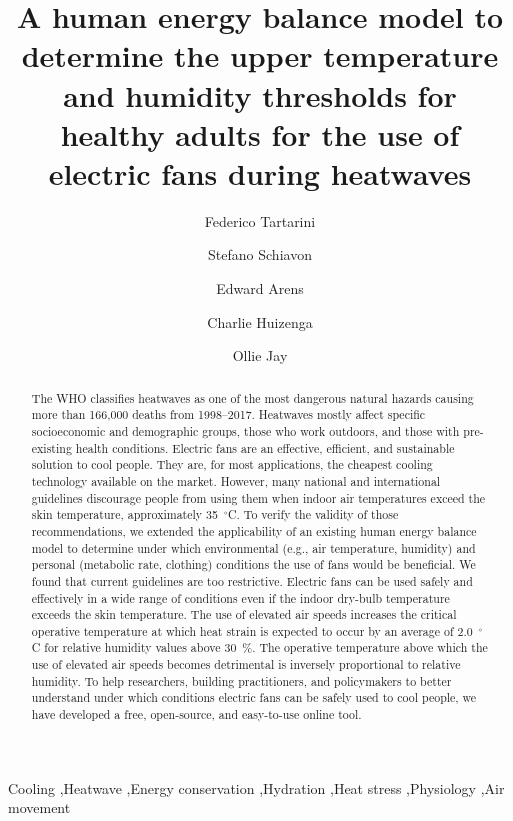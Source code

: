 
\begin{frontmatter}

\title{A human energy balance model to determine the upper temperature and humidity thresholds for healthy adults for the use of electric fans during heatwaves}

\author[sinBerBest]{Federico Tartarini}
\author[CBE]{Stefano Schiavon}
\author[CBE]{Edward Arens}
\author[CBE]{Charlie Huizenga}
 \author[USYD]{Ollie Jay}

\address[sinBerBest]{SinBerBEST, Berkeley Education Alliance for Research in Singapore, Singapore}
\address[CBE]{Center for the Built Environment, University of California, Berkeley, USA}
 \address[USYD]{Sydney School of Health Sciences, Faculty of Medicine and Health, The University of Sydney, Sydney, Australia}

\begin{abstract}
    The WHO classifies heatwaves as one of the most dangerous natural hazards causing more than 166,000 deaths from 1998--2017.
    Heatwaves mostly affect specific socioeconomic and demographic groups, those who work outdoors, and those with pre-existing health conditions.
    Electric fans are an effective, efficient, and sustainable solution to cool people.
    They are, for most applications, the cheapest cooling technology available on the market.
    However, many national and international guidelines discourage people from using them when indoor air temperatures exceed the skin temperature, approximately 35~$^{\circ}$C\@.
    To verify the validity of those recommendations, we extended the applicability of an existing human energy balance model to determine under which environmental (e.g., air temperature, humidity) and personal (metabolic rate, clothing) conditions the use of fans would be beneficial.
    We found that current guidelines are too restrictive.
    Electric fans can be used safely and effectively in a wide range of conditions even if the indoor dry-bulb temperature exceeds the skin temperature.
    The use of elevated air speeds increases the critical operative temperature at which heat strain is expected to occur by an average of 2.0~$^{\circ}$C for relative humidity values above 30~\%\@.
    The operative temperature above which the use of elevated air speeds becomes detrimental is inversely proportional to relative humidity.
    To help researchers, building practitioners, and policymakers to better understand under which conditions electric fans can be safely used to cool people, we have developed a free, open-source, and easy-to-use online tool.
\end{abstract}

\begin{keyword}
Cooling \sep Heatwave \sep Energy conservation \sep Hydration \sep Heat stress \sep Physiology \sep Air movement
\end{keyword}

\end{frontmatter}
